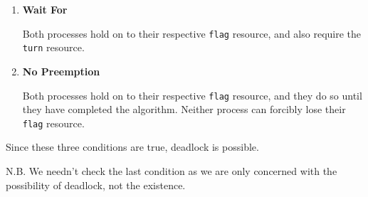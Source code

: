 \documentclass[12pt,letterpaper]{article}
\begin{document}
\begin{enumerate}
\begin{enumerate}
\begin{itemize}
\begin{enumerate}
                \item
                  \textbf{Wait For}

                  Both processes hold on to their respective \texttt{flag} resource,
                  and also require the \texttt{turn} resource.

                \item
                  \textbf{No Preemption}

                  Both processes hold on to their respective \texttt{flag} resource,
                  and they do so until they have completed the algorithm.
                  Neither process can forcibly lose their \texttt{flag} resource.
              \end{enumerate}

              Since these three conditions are true, deadlock is possible.

              N.B. We needn't check the last condition as we are only concerned with the possibility of deadlock, not the existence.
          \end{itemize}
      \end{enumerate}
  \end{enumerate}
\end{document}

